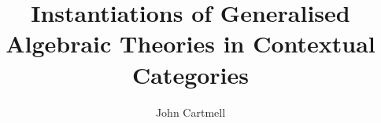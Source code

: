 \documentclass[10pt,a4paper]{article}
\theoremstyle{remark}
\begin{document}
\title{Instantiations of Generalised Algebraic Theories in Contextual Categories}

\author{John Cartmell}

\maketitle



\newcommand{\gatU}{\gat[U]}
\newcommand{\gatUw}{\gatU\ }
\newcommand{\CofU}{\ccat[C](\gat[U])}
\newcommand{\KU}{K_{\gat[U]}}
\newcommand{\KUp}{K_{\gat[U']}}
\newcommand{\catCon}{\cat{Con}}
\newcommand{\catGAT}{\cat{GAT}}

\newcommand{\gatrule}[2]{$#1 \tstyle #2$}

\newcommand{\inlinedisplay}[1]
{
\setlength{\fboxsep}{1.5pt}
\setlength{\fboxrule}{0pt}
\fbox{$\displaystyle #1$}
}


\newcommand{\Isort}{I_{sort}}
\newcommand{\Iop}{I_{op}}
\newcommand {\Ihat}{\hat{I}}

\renewcommand{\crossx}[3]{#1 \underset{\tiny #3}{\cross} #2}
\newcommand{\fonestar}   {{f_1}\kern-.15em^*}
\newcommand{\ftwostar}   {{f_2}\kern-.15em^*}
\newcommand{\fjstar}     {{f_j}\kern-.2em^*}
\newcommand{\fjpstar}    {{f_{j-1}}\kern-.25em^*}
\newcommand{\smstar}{{s_m}\kern-.25em^*}
\newcommand{\sonestar}{{s_1}\kern-.15em^*}

\newcommand{\Trule} {T-rule\ }
\newcommand{\trule} {$\in$-rule\ }
\newcommand{\Teqrule} {T=-rule\ }
\newcommand{\teqrule} {$\in=$-rule\ }

\newcommand{\Imapsto}{\scaleto{\mapsto}{10pt}}

\newcommand{\gatinterpretationdetail}[5]{
\refstepcounter{equation}(\theequation)\label{#1}& \gatrule{#2}{#3}&$\mapsto$&&$#4$&#5}

\newcommand{\gatinterpretationintro}[5]{
\refstepcounter{equation}(\theequation)\label{#1}& \gatrule{#2}{#3}&$\mapsto$&&\cellcolor{lightergrey}$#4$&#5}

\newcommand{\gatinterpretationmapeqv}[2]{&&&=&\ \ $#1$&#2}
\newcommand{\gatinterpretationmapeqvsingle}[1]{&&&=&\multicolumn{2}{l}{\ \ $#1$}}

\newcommand{\gatinterpretationaxcond}[5]{
\refstepcounter{equation}(\theequation)\label{#1}& \gatrule{#2}{#3}&$\scriptstyle iff$&&\cellcolor{lightergrey}$#4$&#5}
\end{document}
